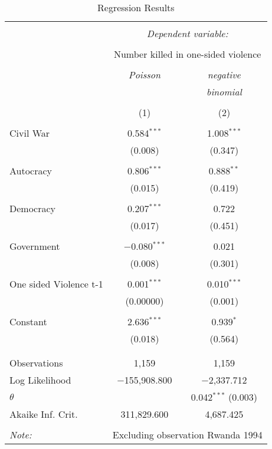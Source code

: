 
\begin{table}[!htbp] \centering 
  \caption{Regression Results} 
  \label{} 
\begin{tabular}{@{\extracolsep{5pt}}lcc} 
\\[-1.8ex]\hline 
\hline \\[-1.8ex] 
 & \multicolumn{2}{c}{\textit{Dependent variable:}} \\ 
\cline{2-3} 
\\[-1.8ex] & \multicolumn{2}{c}{Number killed in one-sided violence} \\ 
\\[-1.8ex] & \textit{Poisson} & \textit{negative} \\ 
 & \textit{} & \textit{binomial} \\ 
\\[-1.8ex] & (1) & (2)\\ 
\hline \\[-1.8ex] 
 Civil War & 0.584$^{***}$ & 1.008$^{***}$ \\ 
  & (0.008) & (0.347) \\ 
  & & \\ 
 Autocracy & 0.806$^{***}$ & 0.888$^{**}$ \\ 
  & (0.015) & (0.419) \\ 
  & & \\ 
 Democracy & 0.207$^{***}$ & 0.722 \\ 
  & (0.017) & (0.451) \\ 
  & & \\ 
 Government & $-$0.080$^{***}$ & 0.021 \\ 
  & (0.008) & (0.301) \\ 
  & & \\ 
 One sided Violence t-1 & 0.001$^{***}$ & 0.010$^{***}$ \\ 
  & (0.00000) & (0.001) \\ 
  & & \\ 
 Constant & 2.636$^{***}$ & 0.939$^{*}$ \\ 
  & (0.018) & (0.564) \\ 
  & & \\ 
\hline \\[-1.8ex] 
Observations & 1,159 & 1,159 \\ 
Log Likelihood & $-$155,908.800 & $-$2,337.712 \\ 
$\theta$ &  & 0.042$^{***}$  (0.003) \\ 
Akaike Inf. Crit. & 311,829.600 & 4,687.425 \\ 
\hline 
\hline \\[-1.8ex] 
\textit{Note:}  & \multicolumn{2}{r}{Excluding observation Rwanda 1994} \\ 
\end{tabular} 
\end{table} 
